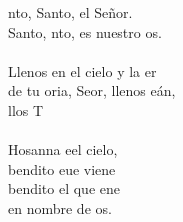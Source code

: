 \begin{cancion}[Santo][Estepa]%
	nto, Santo, el Señor.\\
	Santo, nto, es nuestro os.\\
	\jump\\
	Llenos en el cielo y la er\\
	de tu oria, Seor, llenos eán,\\
	llos T\\
	\jump\\
	Hosanna eel cielo, \\
	bendito eue viene\\
	bendito el que ene \\
	en nombre de os.\\
\end{cancion}%
